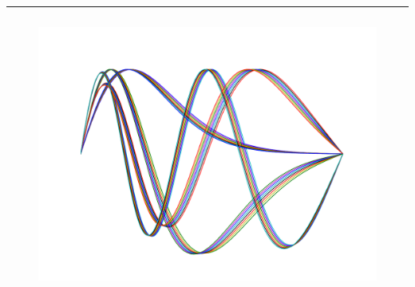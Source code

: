 



\maketitle
\vspace{-5mm}
\begin{center}
\noindent\rule{13cm}{0.4pt}
\end{center}

\vspace{40mm}

\begin{figure}[h!]
\centering
\includegraphics[width=15cm,height=9cm]{../src/plot/frontImage}
\end{figure}


\thispagestyle{empty}
\newpage



% 






